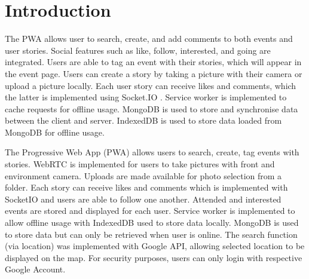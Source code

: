 \documentclass[11pt, a4paper]{article}
\begin{document}
\section{Introduction}
The PWA allows user to search, create, and add comments to both events and user stories. Social
features such as like, follow, interested, and going are integrated. Users are able to tag an event
with their stories, which will appear in the event page. Users can create a story by taking a
picture with their camera or upload a picture locally. Each user story can receive likes and
comments, which the latter is implemented using Socket.IO \cite{socketio, week6}. Service worker is
implemented to cache requests for offline usage. MongoDB is used to store and synchronise data
between the client and server. IndexedDB is used to store data loaded from MongoDB for offline
usage.

The Progressive Web App (PWA) allows users to search, create, tag events with stories. WebRTC is
implemented for users to take pictures with front and environment camera. Uploads are made available
for photo selection from a folder. Each story can receive likes and comments which is implemented
with SocketIO and users are able to follow one another. Attended and interested events are stored
and displayed for each user. Service worker is implemented to allow offline usage with IndexedDB
used to store data locally. MongoDB is used to store data but can only be retrieved when user is
online. The search function (via location) was implemented with Google API, allowing selected
location to be displayed on the map. For security purposes, users can only login with respective
Google Account.
\end{document}
